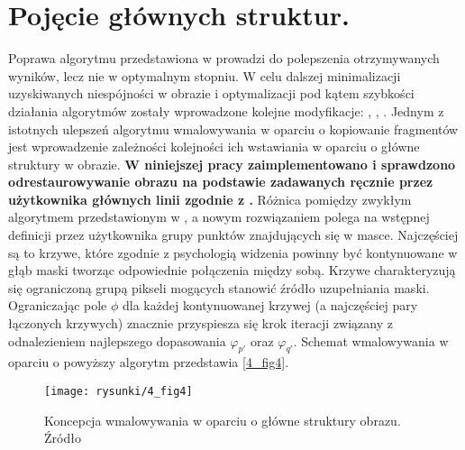 \documentclass[12pt, twoside, openany]{report}
\theoremstyle{definition}
\begin{document}
\section{Pojęcie głównych struktur.}
Poprawa algorytmu przedstawiona w \cite{criminisi2004region} prowadzi do polepszenia otrzymywanych wyników, lecz nie w optymalnym stopniu. W celu dalszej minimalizacji uzyskiwanych niespójności w obrazie i optymalizacji pod kątem szybkości działania algorytmów zostały wprowadzone kolejne modyfikacje: \cite{StructurePropagationManual},  \cite{malluvalasaimplementation}, \cite{SalientStrucTexProp}. 
Jednym z istotnych ulepszeń algorytmu wmalowywania w oparciu o kopiowanie fragmentów jest wprowadzenie zależności kolejności ich wstawiania w oparciu o główne struktury w obrazie.
\textbf{W niniejszej pracy zaimplementowano i sprawdzono odrestaurowywanie obrazu na podstawie zadawanych ręcznie przez użytkownika głównych linii zgodnie z \cite{StructurePropagationManual}.}
Różnica pomiędzy zwykłym algorytmem przedstawionym w \cite{criminisi2004region}, a nowym rozwiązaniem polega na wstępnej definicji przez użytkownika grupy punktów znajdujących się w masce. Najczęściej są to krzywe, które zgodnie z psychologią widzenia powinny być kontynuowane w głąb maski tworząc odpowiednie połączenia między sobą. Krzywe charakteryzują się ograniczoną grupą pikseli mogących stanowić źródło uzupełniania maski. Ograniczając pole $\phi $ dla każdej kontynuowanej krzywej (a najczęściej pary łączonych krzywych) znacznie przyspiesza się krok iteracji związany z odnalezieniem najlepszego dopasowania ${\varphi }_{p'}$ oraz ${\varphi }_{q'}$. Schemat wmalowywania w oparciu o powyższy algorytm przedstawia \autoref{4_fig4}.
\begin{figure}[!h]
	\centering
	\texttt{[image: rysunki/4\_fig4]}
	\caption{Koncepcja wmalowywania w oparciu o główne struktury obrazu. Źródło \cite{StructurePropagationManual}}
	\label{4_fig4} 
\end{figure}
\end{document}
